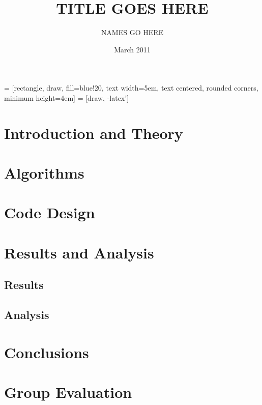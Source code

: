 \documentclass[12pt]{report}
\title{TITLE GOES HERE}
\author{NAMES GO HERE}
\date{March 2011}
\begin{document}
\usetikzlibrary{shapes,arrows}


 = [rectangle, draw, fill=blue!20, 
    text width=5em, text centered, rounded corners, minimum height=4em]
 = [draw, -latex']

\maketitle

\begin{abstract}
\end{abstract}

\tableofcontents

\chapter{Introduction and Theory}

\chapter{Algorithms}

\chapter{Code Design}

\chapter{Results and Analysis}
\section{Results}
\section{Analysis}

\chapter{Conclusions}

\chapter{Group Evaluation}

\end{document}
